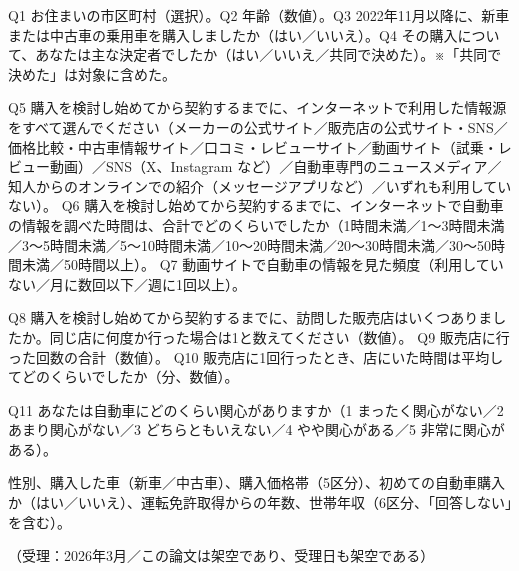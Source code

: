 \begin{description}[style=nextline,leftmargin=1\zw,font=\normalfont\sffamily\bfseries,itemsep=3pt]
  \item[スクリーニング]
  Q1 お住まいの市区町村（選択）。Q2 年齢（数値）。Q3 2022年11月以降に、新車または中古車の乗用車を購入しましたか（はい／いいえ）。Q4 その購入について、あなたは主な決定者でしたか（はい／いいえ／共同で決めた）。※「共同で決めた」は対象に含めた。
  \item[情報探索]
  Q5 購入を検討し始めてから契約するまでに、インターネットで利用した情報源をすべて選んでください（メーカーの公式サイト／販売店の公式サイト・SNS／価格比較・中古車情報サイト／口コミ・レビューサイト／動画サイト（試乗・レビュー動画）／SNS（X、Instagram など）／自動車専門のニュースメディア／知人からのオンラインでの紹介（メッセージアプリなど）／いずれも利用していない）。
  Q6 購入を検討し始めてから契約するまでに、インターネットで自動車の情報を調べた時間は、合計でどのくらいでしたか（1時間未満／1〜3時間未満／3〜5時間未満／5〜10時間未満／10〜20時間未満／20〜30時間未満／30〜50時間未満／50時間以上）。
  Q7 動画サイトで自動車の情報を見た頻度（利用していない／月に数回以下／週に1回以上）。
  \item[販売店訪問]
  Q8 購入を検討し始めてから契約するまでに、訪問した販売店はいくつありましたか。同じ店に何度か行った場合は1と数えてください（数値）。
  Q9 販売店に行った回数の合計（数値）。
  Q10 販売店に1回行ったとき、店にいた時間は平均してどのくらいでしたか（分、数値）。
  \item[関心度]
  Q11 あなたは自動車にどのくらい関心がありますか（1 まったく関心がない／2 あまり関心がない／3 どちらともいえない／4 やや関心がある／5 非常に関心がある）。
  \item[属性]
  性別、購入した車（新車／中古車）、購入価格帯（5区分）、初めての自動車購入か（はい／いいえ）、運転免許取得からの年数、世帯年収（6区分、「回答しない」を含む）。
\end{description}

\vspace{6mm}
\begin{center}
{\footnotesize\color{inkthree}（受理：2026年3月／この論文は架空であり、受理日も架空である）}
\end{center}



